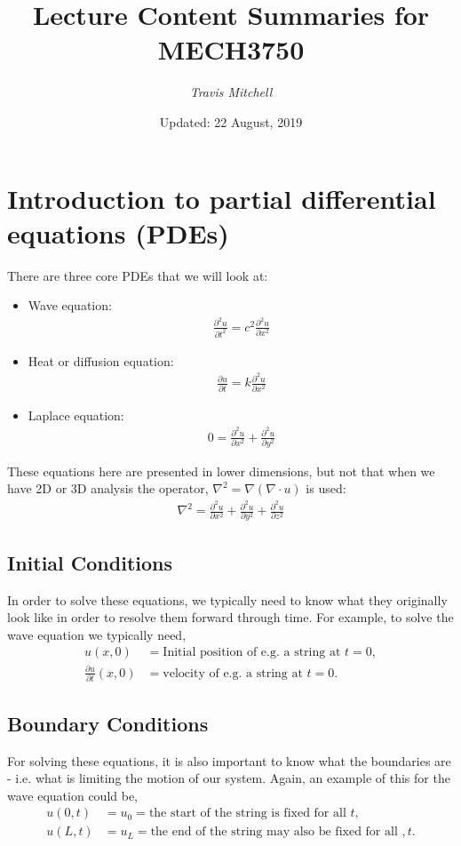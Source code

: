 \documentclass[11pt,a4paper]{report}
\author{\textit{Travis Mitchell}}
\title{Lecture Content Summaries for MECH3750}
\date{Updated: 22 August, 2019}
\theoremstyle{definition}
\begin{document}
\section{Introduction to partial differential equations (PDEs)}
There are three core PDEs that we will look at:
\begin{itemize}
	\item Wave equation:
		\begin{align*}
			\frac{\partial^2 u}{\partial t^2} = c^2 \frac{\partial^2 u}{\partial x^2}
		\end{align*}
	\item Heat or diffusion equation:
		\begin{align*}
			\frac{\partial u}{\partial t} = k \frac{\partial^2 u}{\partial x^2}
		\end{align*}
	\item Laplace equation:
		\begin{align*}
			0 =  \frac{\partial^2 u}{\partial x^2} +  \frac{\partial^2 u}{\partial y^2}
		\end{align*}
\end{itemize}
These equations here are presented in lower dimensions, but not that when we have 2D or 3D analysis the operator, $\nabla^2 = \nabla (\nabla\cdot u)$ is used:
\begin{align*}
	\nabla^2 =  \frac{\partial^2 u}{\partial x^2} +  \frac{\partial^2 u}{\partial y^2} +  \frac{\partial^2 u}{\partial z^2}
\end{align*}

\subsection{Initial Conditions}
In order to solve these equations, we typically need to know what they originally look like in order to resolve them forward through time. For example, to solve the wave equation we typically need,
\begin{align*}
	u(x,0) &= \text{Initial position of e.g. a string at } t=0, \\
	\frac{\partial u}{\partial t} (x,0) &= \text{velocity of e.g. a string at } t=0.
\end{align*}

\subsection{Boundary Conditions}
For solving these equations, it is also important to know what the boundaries are - i.e. what is limiting the motion of our system. Again, an example of this for the wave equation could be,
\begin{align*}
	u(0,t) &= u_0 = \text{the start of the string is fixed for all } t, \\
	u(L,t) &= u_L = \text{the end of the string may also be fixed for all }, t.
\end{align*}
\end{document}
